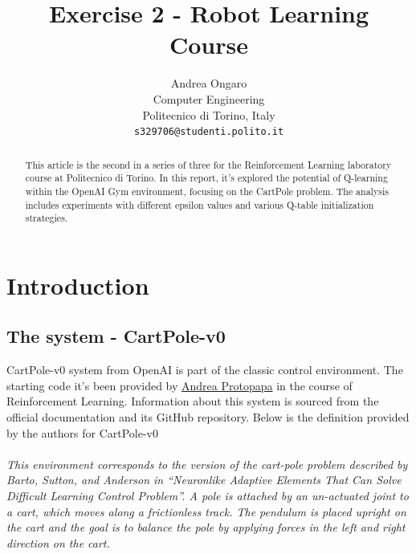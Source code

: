 \documentclass{article}
\title{Exercise 2 - Robot Learning Course}
\author{
  Andrea Ongaro\\
	Computer Engineering\\
	Politecnico di Torino, Italy\\
	\texttt{s329706@studenti.polito.it} \\
}
\begin{document}
\maketitle


\begin{abstract}
This article is the second in a series of three for the Reinforcement Learning laboratory course at Politecnico di Torino. In this report, it's explored the potential of Q-learning within the OpenAI Gym environment, focusing on the CartPole problem. The analysis includes experiments with different epsilon values and various Q-table initialization strategies. 

\end{abstract}



\section{Introduction}
\subsection{The system - CartPole-v0}
CartPole-v0 system from OpenAI is part of the classic control environment. The starting code it's been provided by \href{https://www.polito.it/personale?p=andrea.protopapa}{Andrea Protopapa} in the course of Reinforcement Learning. Information about this system is sourced from the official documentation \cite{Cart_pole} and its GitHub repository. Below is the definition provided by the authors for CartPole-v0\\ \\
\textit{This environment corresponds to the version of the cart-pole problem described by Barto, Sutton, and Anderson in “Neuronlike Adaptive Elements That Can Solve Difficult Learning Control Problem”. A pole is attached by an un-actuated joint to a cart, which moves along a frictionless track. The pendulum is placed upright on the cart and the goal is to balance the pole by applying forces in the left and right direction on the cart.\citep{Cart_pole}}
\end{document}
